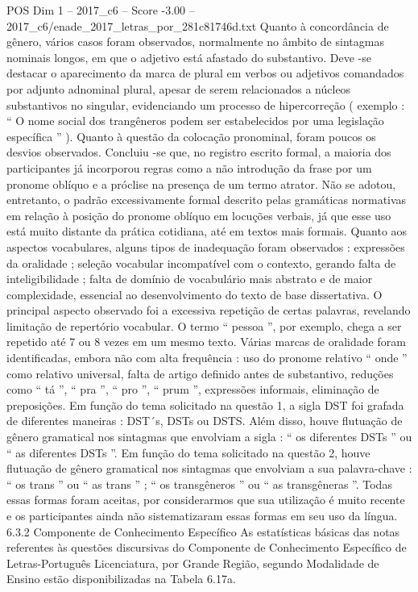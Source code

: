 \begin{textsample}{POS Dim 1 – 2017\_c6 – Score -3.00 – 2017\_c6/enade\_2017\_letras\_por\_281c81746d.txt}
Quanto à concordância de gênero, vários casos foram observados, normalmente no âmbito de sintagmas nominais longos, em que o adjetivo está afastado do substantivo.
Deve -se destacar o aparecimento da marca de plural em verbos ou adjetivos comandados por adjunto adnominal plural, apesar de serem relacionados a núcleos substantivos no singular, evidenciando um processo de hipercorreção ( exemplo : “ O nome social dos trangêneros podem ser estabelecidos por uma legislação específica ” ).
Quanto à questão da colocação pronominal, foram poucos os desvios observados.
Concluiu -se que, no registro escrito formal, a maioria dos participantes já incorporou regras como a não introdução da frase por um pronome oblíquo e a próclise na presença de um termo atrator.
Não se adotou, entretanto, o padrão excessivamente formal descrito pelas gramáticas normativas em relação à posição do pronome oblíquo em locuções verbais, já que esse uso está muito distante da prática cotidiana, até em textos mais formais.
Quanto aos aspectos vocabulares, alguns tipos de inadequação foram observados : expressões da oralidade ; seleção vocabular incompatível com o contexto, gerando falta de inteligibilidade ; falta de domínio de vocabulário mais abstrato e de maior complexidade, essencial ao desenvolvimento do texto de base dissertativa.
O principal aspecto observado foi a excessiva repetição de certas palavras, revelando limitação de repertório vocabular.
O termo “ pessoa ”, por exemplo, chega a ser repetido até 7 ou 8 vezes em um mesmo texto.
Várias marcas de oralidade foram identificadas, embora não com alta frequência : uso do pronome relativo “ onde ” como relativo universal, falta de artigo definido antes de substantivo, reduções como “ tá ”, “ pra ”, “ pro ”, “ prum ”, expressões informais, eliminação de preposições.
Em função do tema solicitado na questão 1, a sigla DST foi grafada de diferentes maneiras : DST´s, DSTs ou DSTS.
Além disso, houve flutuação de gênero gramatical nos sintagmas que envolviam a sigla : “ os diferentes DSTs ” ou “ as diferentes DSTs ”.
Em função do tema solicitado na questão 2, houve flutuação de gênero gramatical nos sintagmas que envolviam a sua palavra-chave : “ os trans ” ou “ as trans ” ; “ os transgêneros ” ou “ as transgêneras ”.
Todas essas formas foram aceitas, por considerarmos que sua utilização é muito recente e os participantes ainda não sistematizaram essas formas em seu uso da língua. 6.3.2 Componente de Conhecimento Específico As estatísticas básicas das notas referentes às questões discursivas do Componente de Conhecimento Específico de Letras-Português Licenciatura, por Grande Região, segundo Modalidade de Ensino estão disponibilizadas na Tabela 6.17a.

\end{textsample}
